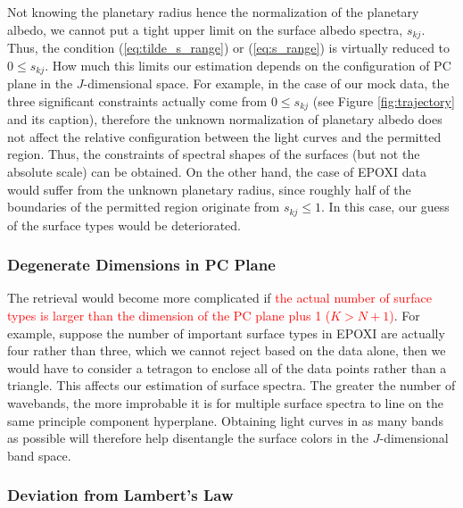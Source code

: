 \documentclass[iop,numberedappendix,apj]{emulateapj}
\def\edit#1{\textcolor{red}{#1}}
\def\memoYF#1{\color{red}[YF: {\bf #1}]\color{black}}
\begin{document}
Not knowing the planetary radius hence the normalization of the planetary albedo, we cannot put a tight upper limit on the surface albedo spectra, $s_{kj}$. 
Thus, the condition (\ref{eq:tilde_s_range}) or (\ref{eq:s_range}) is virtually reduced to $0 \leq s_{kj}$. 
How much this limits our estimation depends on the configuration of PC plane in the $J$-dimensional space. 
For example, in the case of our mock data, the three significant constraints actually come from $0 \leq s_{kj}$ (see Figure \ref{fig:trajectory} and its caption), therefore the unknown normalization of planetary albedo does not affect the relative configuration between the light curves and the permitted region. 
Thus, the constraints of spectral shapes of the surfaces (but not the absolute scale) can be obtained. 
On the other hand, the case of EPOXI data would suffer from the unknown planetary radius, since roughly half of the boundaries of the permitted region originate from $ s_{kj} \leq 1$. 
In this case, our guess of the surface types would be deteriorated. 


\subsubsection{Degenerate Dimensions in PC Plane}

The retrieval would become more complicated if \edit{the actual number of surface types is larger than the dimension of the PC plane plus 1 ($K > N + 1 $)}. 
For example, suppose the number of important surface types in EPOXI are actually four rather than three, which we cannot reject based on the data alone, then we would have to consider a tetragon to enclose all of the data points rather than a triangle. 
This affects our estimation of surface spectra. 
The greater the number of wavebands, the more improbable it is for multiple surface spectra to line on the same principle component hyperplane. 
Obtaining light curves in as many bands as possible will therefore help disentangle the surface colors in the $J$-dimensional band space. 


\subsubsection{Deviation from Lambert's Law}
\label{ss:deviate_Lambert}
\end{document}

